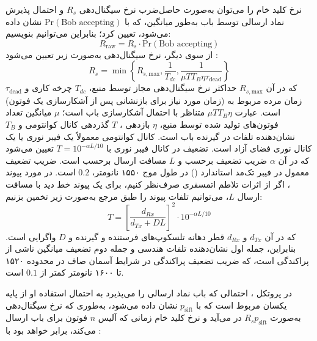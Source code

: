 نرخ کلید خام را می‌توان به‌صورت حاصل‌ضرب نرخ سیگنال‌دهی $R_s$ و احتمال پذیرش نماد ارسالی توسط باب به‌طور میانگین، که با $\text{Pr}(\text{Bob accepting})$ نشان داده می‌شود، تعیین کرد؛ بنابراین می‌توانیم بنویسیم:
\begin{equation}
	R_{\text{raw}} = R_s \cdot \text{Pr}(\text{Bob accepting})
	\label{eq:6-23}
\end{equation}
از سوی دیگر، نرخ سیگنال‌دهی به‌صورت زیر تعیین می‌شود \cite{48}:
\begin{equation}
	R_s = \min \left\{ R_{s,\text{max}}, \frac{1}{T_{dc}}, \frac{1}{\mu T T_B \eta \tau_{\text{dead}}} \right\}
	\label{eq:6-24}
\end{equation}
که در آن $R_{s,\text{max}}$ حداکثر نرخ سیگنال‌دهی مجاز توسط منبع، $T_{dc}$ چرخه کاری و $\tau_{\text{dead}}$ زمان مرده مربوط به  (زمان مورد نیاز برای بازنشانی  پس از آشکارسازی یک فوتون) است. عبارت $\mu T T_B \eta$ متناظر با احتمال آشکارسازی باب است؛ $\mu$ میانگین تعداد فوتون‌های تولید شده توسط منبع، $\eta$ بازدهی ، $T$ گذردهی کانال کوانتومی و $T_B$ نشان‌دهنده تلفات در گیرنده باب است. کانال کوانتومی معمولاً یک فیبر نوری یا یک کانال نوری فضای آزاد است. تضعیف در کانال فیبر نوری با $T = 10^{-\alpha L/10}$ تعیین می‌شود که در آن $\alpha$ ضریب تضعیف برحسب  و $L$ مسافت ارسال برحسب  است. ضریب تضعیف معمول در فیبر تک‌مد استاندارد () در طول موج ۱۵۵۰ نانومتر، $0.2$  است. در مورد پیوند ، اگر از اثرات تلاطم اتمسفری صرف‌نظر کنیم، برای یک پیوند خط دید با مسافت ارسال $L$، می‌توانیم تلفات پیوند  را طبق مرجع \cite{49} به‌صورت زیر تخمین بزنیم:
\begin{equation*}
	T = \left[ \frac{d_{Rx}}{d_{Tx} + DL} \right]^2 \cdot 10^{-\alpha L/10}
\end{equation*}
که در آن $d_{Tx}$ و $d_{Rx}$ قطر دهانه تلسکوپ‌های فرستنده و گیرنده و $D$ واگرایی است. بنابراین، جمله اول نشان‌دهنده تلفات هندسی و جمله دوم تضعیف میانگین ناشی از پراکندگی است، که ضریب تضعیف پراکندگی در شرایط آسمان صاف در محدوده ۱۵۲۰ تا ۱۶۰۰ نانومتر کمتر از $0.1$  است.

در پروتکل ، احتمالی که باب نماد ارسالی را می‌پذیرد به احتمال استفاده او از پایه یکسان مربوط است که با $p_{\text{sift}}$ نشان داده می‌شود، به‌طوری که نرخ سیگنال‌دهی به‌صورت $R_s p_{\text{sift}}$ در می‌آید و نرخ کلید خام زمانی که آلیس $n$ فوتون برای باب ارسال می‌کند، برابر خواهد بود با \cite{48}:


